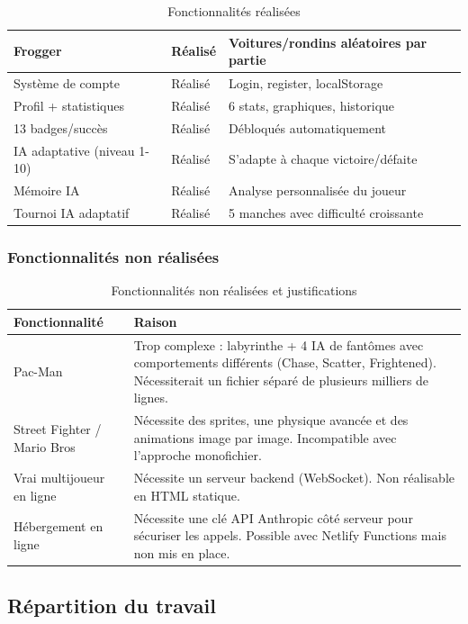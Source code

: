 \documentclass[a4paper, 12pt, twoside]{article}
\newcommand{\cmark}{\ding{51}}
\begin{document}
\begin{table}[H]
\begin{tabular}{|p{6cm}|p{2cm}|p{5cm}|}
\hline
Frogger & \cmark{} Réalisé & Voitures/rondins aléatoires par partie \\
\hline
Système de compte & \cmark{} Réalisé & Login, register, localStorage \\
\hline
Profil + statistiques & \cmark{} Réalisé & 6 stats, graphiques, historique \\
\hline
13 badges/succès & \cmark{} Réalisé & Débloqués automatiquement \\
\hline
IA adaptative (niveau 1-10) & \cmark{} Réalisé & S'adapte à chaque victoire/défaite \\
\hline
Mémoire IA & \cmark{} Réalisé & Analyse personnalisée du joueur \\
\hline
Tournoi IA adaptatif & \cmark{} Réalisé & 5 manches avec difficulté croissante \\
\hline
\end{tabular}
\caption{Fonctionnalités réalisées}
\label{tab:fonctionnalites}
\end{table}

\subsubsection{Fonctionnalités non réalisées}

\begin{table}[H]
\centering
\begin{tabular}{|p{5cm}|p{8cm}|}
\hline
\textbf{Fonctionnalité} & \textbf{Raison} \\
\hline
Pac-Man & Trop complexe : labyrinthe + 4 IA de fantômes avec comportements différents (Chase, Scatter, Frightened). Nécessiterait un fichier séparé de plusieurs milliers de lignes. \\
\hline
Street Fighter / Mario Bros & Nécessite des sprites, une physique avancée et des animations image par image. Incompatible avec l'approche monofichier. \\
\hline
Vrai multijoueur en ligne & Nécessite un serveur backend (WebSocket). Non réalisable en HTML statique. \\
\hline
Hébergement en ligne & Nécessite une clé API Anthropic côté serveur pour sécuriser les appels. Possible avec Netlify Functions mais non mis en place. \\
\hline
\end{tabular}
\caption{Fonctionnalités non réalisées et justifications}
\label{tab:nonrealise}
\end{table}

\subsection{Répartition du travail}
\end{document}
